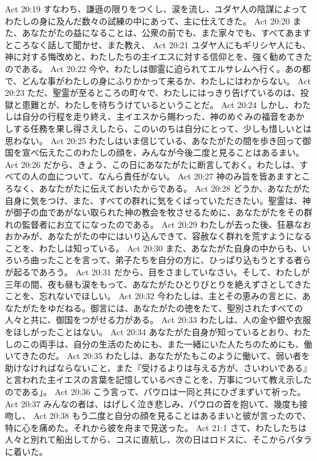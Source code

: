 Act 20:19  すなわち、謙遜の限りをつくし、涙を流し、ユダヤ人の陰謀によってわたしの身に及んだ数々の試練の中にあって、主に仕えてきた。
Act 20:20  また、あなたがたの益になることは、公衆の前でも、また家々でも、すべてあますところなく話して聞かせ、また教え、
Act 20:21  ユダヤ人にもギリシヤ人にも、神に対する悔改めと、わたしたちの主イエスに対する信仰とを、強く勧めてきたのである。
Act 20:22  今や、わたしは御霊に迫られてエルサレムへ行く。あの都で、どんな事がわたしの身にふりかかって来るか、わたしにはわからない。
Act 20:23  ただ、聖霊が至るところの町々で、わたしにはっきり告げているのは、投獄と患難とが、わたしを待ちうけているということだ。
Act 20:24  しかし、わたしは自分の行程を走り終え、主イエスから賜わった、神のめぐみの福音をあかしする任務を果し得さえしたら、このいのちは自分にとって、少しも惜しいとは思わない。
Act 20:25  わたしはいま信じている、あなたがたの間を歩き回って御国を宣べ伝えたこのわたしの顔を、みんなが今後二度と見ることはあるまい。
Act 20:26  だから、きょう、この日にあなたがたに断言しておく。わたしは、すべての人の血について、なんら責任がない。
Act 20:27  神のみ旨を皆あますところなく、あなたがたに伝えておいたからである。
Act 20:28  どうか、あなたがた自身に気をつけ、また、すべての群れに気をくばっていただきたい。聖霊は、神が御子の血であがない取られた神の教会を牧させるために、あなたがたをその群れの監督者にお立てになったのである。
Act 20:29  わたしが去った後、狂暴なおおかみが、あなたがたの中にはいり込んできて、容赦なく群れを荒すようになることを、わたしは知っている。
Act 20:30  また、あなたがた自身の中からも、いろいろ曲ったことを言って、弟子たちを自分の方に、ひっぱり込もうとする者らが起るであろう。
Act 20:31  だから、目をさましていなさい。そして、わたしが三年の間、夜も昼も涙をもって、あなたがたひとりびとりを絶えずさとしてきたことを、忘れないでほしい。
Act 20:32  今わたしは、主とその恵みの言とに、あなたがたをゆだねる。御言には、あなたがたの徳をたて、聖別されたすべての人々と共に、御国をつがせる力がある。
Act 20:33  わたしは、人の金や銀や衣服をほしがったことはない。
Act 20:34  あなたがた自身が知っているとおり、わたしのこの両手は、自分の生活のためにも、また一緒にいた人たちのためにも、働いてきたのだ。
Act 20:35  わたしは、あなたがたもこのように働いて、弱い者を助けなければならないこと、また『受けるよりは与える方が、さいわいである』と言われた主イエスの言葉を記憶しているべきことを、万事について教え示したのである」。
Act 20:36  こう言って、パウロは一同と共にひざまずいて祈った。
Act 20:37  みんなの者は、はげしく泣き悲しみ、パウロの首を抱いて、幾度も接吻し、
Act 20:38  もう二度と自分の顔を見ることはあるまいと彼が言ったので、特に心を痛めた。それから彼を舟まで見送った。
Act 21:1  さて、わたしたちは人々と別れて船出してから、コスに直航し、次の日はロドスに、そこからパタラに着いた。
